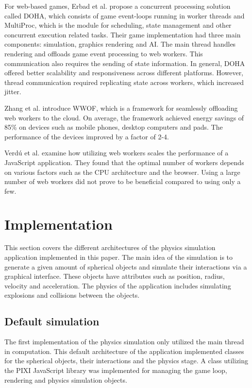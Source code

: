\documentclass[conference]{IEEEtran}
\begin{document}
For web-based games, Erbad et al. \cite{doha} propose a concurrent processing solution called DOHA, which consists of game event-loops running in worker threads and MultiProc, which is the module for scheduling, state management and other concurrent execution related tasks. Their game implementation had three main components: simulation, graphics rendering and AI. The main thread handles rendering and offloads game event processing to web workers. This communication also requires the sending of state information. In general, DOHA offered better scalability and responsiveness across different platforms. However, thread communication required replicating state across workers, which increased jitter.

Zhang et al. \cite{zhang} introduce WWOF, which is a framework for seamlessly offloading web workers to the cloud. On average, the framework achieved energy savings of 85\% on devices such as mobile phones, desktop computers and pads. The performance of the devices improved by a factor of 2-4.

Verdú et al. \cite{verdu} examine how utilizing web workers scales the performance of a JavaScript application. They found that the optimal number of workers depends on various factors such as the CPU architecture and the browser. Using a large number of web workers did not prove to be beneficial compared to using only a few.

\section{Implementation}
\label{sec:implementation}

This section covers the different architectures of the physics simulation application implemented in this paper. The main idea of the simulation is to generate a given amount
of spherical objects and simulate their interactions via a graphical interface. These objects have attributes such as position, radius, velocity and acceleration. The 
physics of the application includes simulating explosions and collisions between the objects.

\subsection{Default simulation} 
\label{sec:default}

The first implementation of the physics simulation only utilized the main thread in computation. This default architecture of the application implemented classes for the
spherical objects, their interactions and the physics stage. A class utilizing the PIXI JavaScript library was implemented for managing the game loop, rendering and
physics simulation objects.
\end{document}

